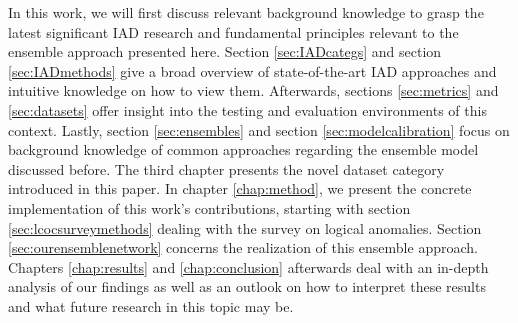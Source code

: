 In this work, we will first discuss relevant background knowledge to grasp the latest significant IAD research and fundamental principles relevant to the ensemble 
approach presented here. Section \ref{sec:IADcategs} and section \ref{sec:IADmethods} give a broad overview of state-of-the-art IAD approaches and intuitive knowledge on how to 
view them. Afterwards, sections \ref{sec:metrics} and \ref{sec:datasets} offer insight into the testing and evaluation environments of this context. Lastly, section \ref{sec:ensembles} and 
section \ref{sec:modelcalibration} focus on background knowledge of common approaches regarding the ensemble model discussed before.\newline
The third chapter presents the novel dataset category introduced in this paper.
In chapter \ref{chap:method}, we present the concrete implementation of this work's contributions, starting with section \ref{sec:lcocsurveymethods} dealing with the survey on logical anomalies. 
Section \ref{sec:ourensemblenetwork} concerns the realization of this ensemble approach.
\newline 
Chapters \ref{chap:results} and \ref{chap:conclusion} afterwards deal with an in-depth analysis of our findings as well as an outlook on how to interpret these results and what future research 
in this topic may be.






